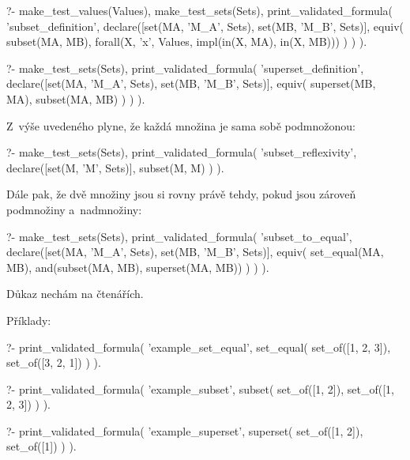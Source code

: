 \begin{prolog}
?- 	make_test_values(Values),
	make_test_sets(Sets),
	print_validated_formula(
		'subset_definition',
		declare([set(MA, 'M_A', Sets), set(MB, 'M_B', Sets)],
			equiv(
				subset(MA, MB),
				forall(X, 'x', Values, impl(in(X, MA), in(X, MB)))
			)
		)
	).
\end{prolog}

\begin{prolog}
?-	make_test_sets(Sets),
	print_validated_formula(
		'superset_definition',
		declare([set(MA, 'M_A', Sets), set(MB, 'M_B', Sets)],
			equiv(
				superset(MB, MA),
				subset(MA, MB)
			)
		)
	).
\end{prolog}

Z~výše uvedeného plyne, že každá množina je sama sobě podmnožonou:

\begin{prolog}
?-	make_test_sets(Sets),
	print_validated_formula(
		'subset_reflexivity',
		declare([set(M, 'M', Sets)],
			subset(M, M)
		)
	).
\end{prolog}

Dále pak, že dvě množiny jsou si rovny právě tehdy, pokud jsou zároveň podmnožiny a~nadmnožiny:

\begin{prolog}
?-	make_test_sets(Sets),
	print_validated_formula(
		'subset_to_equal',
		declare([set(MA, 'M_A', Sets), set(MB, 'M_B', Sets)],
			equiv(
				set_equal(MA, MB),
				and(subset(MA, MB), superset(MA, MB))
			)
		)
	).
\end{prolog}

Důkaz nechám na čtenářích.

Příklady:

\begin{prolog}
?-	print_validated_formula(
		'example_set_equal',
		set_equal(
			set_of([1, 2, 3]),
			set_of([3, 2, 1])
		)
	).
\end{prolog}
\begin{prolog}
?-	print_validated_formula(
		'example_subset',
		subset(
			set_of([1, 2]),
			set_of([1, 2, 3])
		)
	).
\end{prolog}
\begin{prolog}
?-	print_validated_formula(
		'example_superset',
		superset(
			set_of([1, 2]),
			set_of([1])
		)
	).
\end{prolog}

